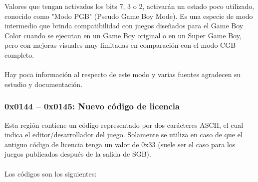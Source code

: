 Valores que tengan activados los bits 7, 3 o 2, activarán un estado poco utilizado, conocido como "Modo PGB" (Pseudo Game Boy Mode). Es una especie de modo intermedio que brinda compatibilidad con juegos diseñados para el Game Boy Color cuando se ejecutan en un Game Boy original o en un Super Game Boy, pero con mejoras visuales muy limitadas en comparación con el modo CGB completo.
\\\\
Hay poca información al respecto de este modo y varias fuentes agradecen su estudio y documentación.

\subsubsection{0x0144 – 0x0145: Nuevo código de licencia}
Esta región contiene un código representado por dos carácteres ASCII, el cual indica el editor/desarrollador del juego. Solamente se utiliza en caso de que el antiguo código de licencia tenga un valor de 0x33 (suele ser el caso para los juegos publicados después de la salida de SGB).
\\\\
Los códigos son los siguientes:
